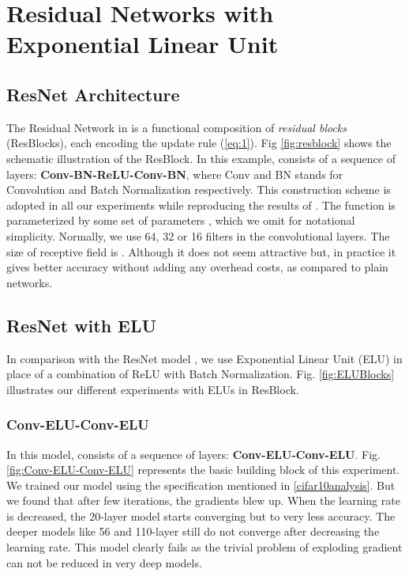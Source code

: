 \documentclass[10pt,twocolumn,letterpaper]{article}
\begin{document}
\section{Residual Networks with Exponential Linear Unit}
\subsection{ResNet Architecture}

The Residual Network in \cite{[1]} is a functional composition of  \emph{residual blocks} (ResBlocks), each encoding the update rule (\ref{eq:1}). Fig \ref{fig:resblock} shows the schematic illustration of the  ResBlock. In this example,  consists of a sequence of layers: \textbf{Conv-BN-ReLU-Conv-BN}, where Conv and BN stands for Convolution and Batch Normalization respectively. This construction scheme is adopted in all our experiments while reproducing the results of \cite{[1]}. The function  is parameterized by some set of  parameters , which we omit for notational simplicity. Normally, we use  64, 32 or 16 filters in the convolutional layers. The size of receptive field is . Although it does not seem attractive but, in practice it gives better accuracy without adding any overhead costs, as compared to plain networks.

\subsection{ResNet with ELU}

In comparison with the ResNet model \cite{[1]}, we use Exponential Linear Unit (ELU) in place of a combination of ReLU with Batch Normalization. 
Fig. \ref{fig:ELUBlocks} illustrates our different experiments with ELUs in ResBlock. 

\subsubsection{Conv-ELU-Conv-ELU}

In this model,  consists of a sequence of layers: \textbf{Conv-ELU-Conv-ELU}. Fig. \ref{fig:Conv-ELU-Conv-ELU} represents the basic building block of this experiment. We trained our model using the specification mentioned in \ref{cifar10analysis}. But we found that after few iterations, the gradients blew up. When the learning rate is decreased, the 20-layer model starts converging but to very less accuracy. The deeper models like 56 and 110-layer still do not converge after decreasing the learning rate. This model clearly fails as the trivial problem of exploding gradient can not be reduced in very deep models.
\end{document}
